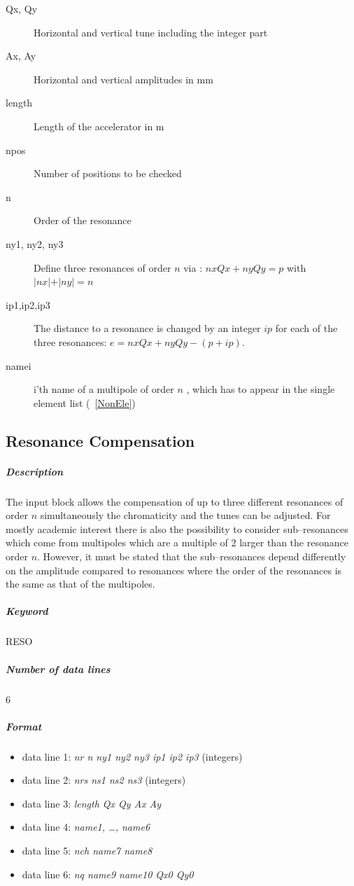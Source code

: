 \begin{description}
\item [Qx, Qy] Horizontal and vertical tune including the integer part
\item [Ax, Ay] Horizontal and vertical amplitudes in mm
\item [length] Length of the accelerator in m
\item [npos] Number of positions to be checked
\item [n] Order of the resonance
\item [ny1, ny2, ny3] Define three resonances of order $n$ via :
  \mbox{$ nx Qx + ny Qy = p $} with \mbox{$ \vert nx \vert + \vert ny
    \vert = n $}
\item [ip1,ip2,ip3] The distance to a resonance is changed by an
  integer $ip$ for each of the three resonances: \mbox{$ e = nx Qx +
    ny Qy - (p + ip) $.}
\item [namei] i'th name of a multipole of order $n$ , which has to
  appear in the single element list (~\ref{NonEle})
\end{description}

\subsection{Resonance Compensation} \label{ResCom}

\subparagraph{Description} The input block allows the compensation of
up to three different resonances of order $n$ simultaneously the
chromaticity and the tunes can be adjusted. For mostly academic
interest there is also the possibility to consider sub--resonances
which come from multipoles which are a multiple of 2 larger than the
resonance order $n$. However, it must be stated that the
sub--resonances depend differently on the amplitude compared to
resonances where the order of the resonances is the same as that of
the multipoles.

\subparagraph{Keyword} RESO \subparagraph{Number of data lines} 6

\subparagraph{Format}
\begin{itemize}
\item data line 1: {\em nr n ny1 ny2 ny3 ip1 ip2 ip3} \/(integers)
\item data line 2: {\em nrs ns1 ns2 ns3} \/(integers)
\item data line 3: {\em length Qx Qy Ax Ay}
\item data line 4: {\em name1, \dots, name6}
\item data line 5: {\em nch name7 name8}
\item data line 6: {\em nq name9 name10 Qx0 Qy0}
\end{itemize}

